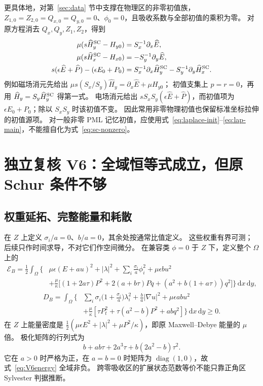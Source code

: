 \documentclass[UTF8,a4paper,11pt,fontset=none]{ctexart}
\numberwithin{equation}{section}
\theoremstyle{definition}
\theoremstyle{definition}
\newcommand{\Om}{\Omega}
\newcommand{\eps}{\epsilon}
\newcommand{\dd}{\,\mathrm d}
\newcommand{\Ecal}{\mathcal E}
\begin{document}
更具体地，对第~\ref{sec:data} 节中支撑在物理区的非零初值族，$Z_{1,0}=Z_{2,0}=Q_{x,0}=Q_{y,0}=0$、$\phi_0=0$，且吸收系数与全部初值的乘积为零。
对原方程消去 $Q_x,Q_y,Z_1,Z_2$，得到
\begin{equation}\label{eq:sc-nonzero}
\begin{aligned}
 \mu(s\widehat H_y^{\rm SC}-H_{y0})&=S_x^{-1}\partial_x\widehat E,\\
 \mu(s\widehat H_x^{\rm SC}-H_{x0})&=-S_y^{-1}\partial_y\widehat E,\\
 s(\eps\widehat E+\widehat P)-(\eps E_0+P_0)
 &=S_x^{-1}\partial_x\widehat H_y^{\rm SC}
   -S_y^{-1}\partial_y\widehat H_x^{\rm SC}.
\end{aligned}
\end{equation}
例如磁场消元先给出
$\mu s(S_x/S_y)\widehat H_y=\partial_x\widehat E+\mu H_{y0}$；
初值支集上 $p=r=0$，再用 $\widehat H_y=S_y\widehat H_y^{\rm SC}$ 得第一式。
电场消元给出 $sS_xS_y(\eps\widehat E+\widehat P)$，而初值项为 $\eps E_0+P_0$；除以 $S_xS_y$ 时该初值不变。
因此常用非零物理初值也保留标准坐标拉伸的初值源项。
对一般非零 PML 记忆初值，应使用式~\eqref{eq:laplace-init}--\eqref{eq:lap-main}，不能擅自化为式~\eqref{eq:sc-nonzero}。

\section{独立复核 V6：全域恒等式成立，但原 Schur 条件不够}
\label{sec:v6}

\subsection{权重延拓、完整能量和耗散}
在 $Z$ 上定义 $\sigma_i/a=0$、$b/a=0$，其余处按通常比值定义。
这些权重有界可测；后续只作时间求导，不对它们作空间微分。
在兼容类 $\phi=0$ 于 $Z$ 下，定义整个 $\Om$ 上的
\begin{equation}\label{eq:V6energy}
\begin{aligned}
 \Ecal_B=\frac12\int_\Om\Big\{&
 \mu\eps(E+au)^2+|\lambda|^2+\sum_i\frac{\sigma_i}{a}\phi_i^2+\mu\eps b u^2\\
 &+\frac\mu\kappa\big[(1+2a\tau)P^2+2(a+b\tau)Pq
 +(a^2+b(1+a\tau))q^2\big]\Big\}\dd x\dd y,
\end{aligned}
\end{equation}
\begin{equation}\label{eq:V6diss}
\begin{aligned}
 D_B=\int_\Om\Big\{&\sum_i\sigma_i\Big(1+\frac{\sigma_i}{a}\Big)\lambda_i^2
 +\frac ba|\nabla u|^2+\mu\eps ab u^2\\
 &+\frac\mu\kappa[\tau P_t^2+\tau(a^2-b)P^2+abq^2]\Big\}\dd x\dd y\ge0.
\end{aligned}
\end{equation}
在 $Z$ 上能量密度是
$\frac12(\mu\eps E^2+|\lambda|^2+\mu P^2/\kappa)$，即原 Maxwell--Debye 能量的 $\mu$ 倍。
极化矩阵的行列式为
\[
 b+ab\tau+2a^3\tau+b(2a^2-b)\tau^2.
\]
它在 $a>0$ 时严格为正，在 $a=b=0$ 时矩阵为 $\operatorname{diag}(1,0)$，故式~\eqref{eq:V6energy} 全域非负。
跨零吸收区的扩展状态范数等价不能只靠正角区 Sylvester 判据推断。
\end{document}
